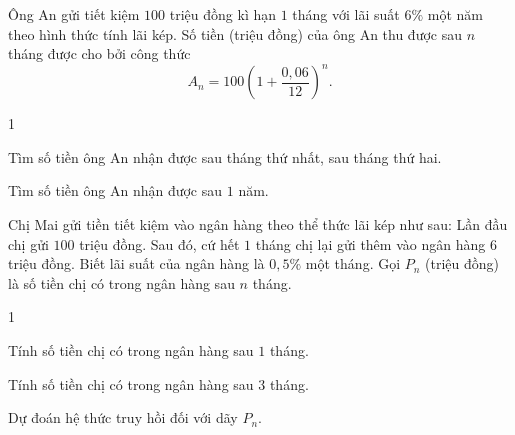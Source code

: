 \begin{bt}
	Ông An gửi tiết kiệm $ 100 $ triệu đồng kì hạn $ 1 $ tháng với lãi suất $6 \%$ một năm theo hình thức tính lãi kép. Số tiền (triệu đồng) của ông An thu được sau $n$ tháng được cho bởi công thức
	$$A_n=100\left(1+\dfrac{0,06}{12}\right)^n.$$
	\begin{enumEX}{1}
		\item Tìm số tiền ông An nhận được sau tháng thứ nhất, sau tháng thứ hai.
		\item Tìm số tiền ông An nhận được sau $ 1 $ năm.
	\end{enumEX}
\end{bt}


\begin{bt}
	Chị Mai gửi tiền tiết kiệm vào ngân hàng theo thể thức lãi kép như sau: Lần đầu chị gửi $ 100 $ triệu đồng. Sau đó, cứ hết $ 1 $ tháng chị lại gửi thêm vào ngân hàng $ 6 $ triệu đồng. Biết lãi suất của ngân hàng là $0,5 \%$ một tháng. Gọi $P_n$ (triệu đồng) là số tiền chị có trong ngân hàng sau $n$ tháng.
	\begin{enumEX}{1}
		\item Tính số tiền chị có trong ngân hàng sau $ 1 $ tháng.
		\item Tính số tiền chị có trong ngân hàng sau $ 3 $ tháng.
		\item Dự đoán hệ thức truy hồi đối với dãy $P_n$.
	\end{enumEX}
\end{bt}



